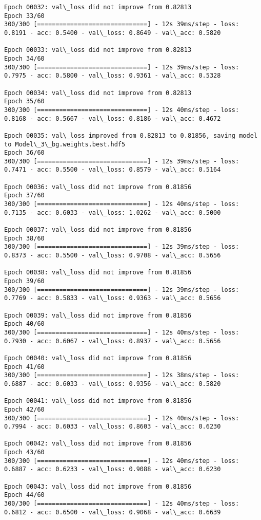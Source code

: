 \documentclass[11pt]{article}
\begin{document}
\begin{Verbatim}[commandchars=\\\{\}]
Epoch 00032: val\_loss did not improve from 0.82813
Epoch 33/60
300/300 [==============================] - 12s 39ms/step - loss: 0.8191 - acc: 0.5400 - val\_loss: 0.8649 - val\_acc: 0.5820

Epoch 00033: val\_loss did not improve from 0.82813
Epoch 34/60
300/300 [==============================] - 12s 39ms/step - loss: 0.7975 - acc: 0.5800 - val\_loss: 0.9361 - val\_acc: 0.5328

Epoch 00034: val\_loss did not improve from 0.82813
Epoch 35/60
300/300 [==============================] - 12s 40ms/step - loss: 0.8168 - acc: 0.5667 - val\_loss: 0.8186 - val\_acc: 0.4672

Epoch 00035: val\_loss improved from 0.82813 to 0.81856, saving model to Model\_3\_bg.weights.best.hdf5
Epoch 36/60
300/300 [==============================] - 12s 39ms/step - loss: 0.7471 - acc: 0.5500 - val\_loss: 0.8579 - val\_acc: 0.5164

Epoch 00036: val\_loss did not improve from 0.81856
Epoch 37/60
300/300 [==============================] - 12s 40ms/step - loss: 0.7135 - acc: 0.6033 - val\_loss: 1.0262 - val\_acc: 0.5000

Epoch 00037: val\_loss did not improve from 0.81856
Epoch 38/60
300/300 [==============================] - 12s 39ms/step - loss: 0.8373 - acc: 0.5500 - val\_loss: 0.9708 - val\_acc: 0.5656

Epoch 00038: val\_loss did not improve from 0.81856
Epoch 39/60
300/300 [==============================] - 12s 39ms/step - loss: 0.7769 - acc: 0.5833 - val\_loss: 0.9363 - val\_acc: 0.5656

Epoch 00039: val\_loss did not improve from 0.81856
Epoch 40/60
300/300 [==============================] - 12s 40ms/step - loss: 0.7930 - acc: 0.6067 - val\_loss: 0.8937 - val\_acc: 0.5656

Epoch 00040: val\_loss did not improve from 0.81856
Epoch 41/60
300/300 [==============================] - 12s 38ms/step - loss: 0.6887 - acc: 0.6033 - val\_loss: 0.9356 - val\_acc: 0.5820

Epoch 00041: val\_loss did not improve from 0.81856
Epoch 42/60
300/300 [==============================] - 12s 40ms/step - loss: 0.7994 - acc: 0.6033 - val\_loss: 0.8603 - val\_acc: 0.6230

Epoch 00042: val\_loss did not improve from 0.81856
Epoch 43/60
300/300 [==============================] - 12s 40ms/step - loss: 0.6887 - acc: 0.6233 - val\_loss: 0.9088 - val\_acc: 0.6230

Epoch 00043: val\_loss did not improve from 0.81856
Epoch 44/60
300/300 [==============================] - 12s 40ms/step - loss: 0.6812 - acc: 0.6500 - val\_loss: 0.9068 - val\_acc: 0.6639


\end{Verbatim}
\end{document}
